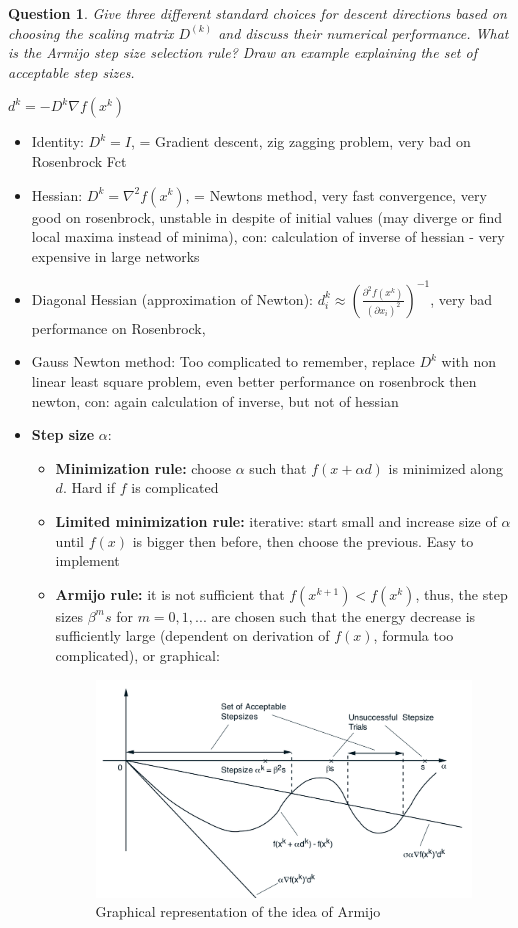 \documentclass{article}
\newtheorem{question}{Question}
\newcommand{\kth}[2][k]{#2^{(#1)}}
\begin{document}
\begin{question}
  Give three different standard choices for descent directions based on choosing the scaling matrix
  \(\kth{D}\) and discuss their numerical performance. What is the Armijo step size selection
  rule? Draw an example explaining the set of acceptable step sizes.
\end{question}
$d^k = -D^k \nabla f (x^k )$
\begin{itemize}
\item Identity: $D^k = I$, = Gradient descent, zig zagging problem, very bad on Rosenbrock Fct
\item Hessian: $D^k = \nabla^2 f(x^k)$, = Newtons method, very fast convergence, very good on
  rosenbrock, unstable in despite of initial values (may diverge or find local maxima instead of
  minima), con: calculation of inverse of hessian - very expensive in large networks
\item Diagonal Hessian (approximation of Newton): $d_i^k \approx \left(
    \frac{\partial^2  f (x^k)}{(\partial x_i)^2}
  \right)^{-1}$, very bad performance on Rosenbrock, 
\item Gauss Newton method: Too complicated to remember, replace $D^k$ with non linear least square
  problem, even better performance on rosenbrock then newton, con: again calculation of inverse, but
  not of hessian
\item \textbf{Step size} $\alpha$: 
  \begin{itemize}
  \item \textbf{Minimization rule:} choose $\alpha$ such that $f(x + \alpha d)$ is minimized along
    $d$. Hard if $f$ is complicated
  \item \textbf{Limited minimization rule:} iterative: start small and increase size of $\alpha$
    until $f(x)$ is bigger then before, then choose the previous. Easy to implement
  \item \textbf{Armijo rule:} it is not sufficient that $f(x^{k+1}) < f(x^k)$, thus, the step sizes
    $\beta^ms$ for $m = 0,1,...$ are chosen such that the energy decrease is sufficiently large
    (dependent on derivation of $f(x)$, formula too complicated), or graphical:
    \begin{figure}[H]
      \includegraphics[width=\textwidth]{armijo.png}
      \caption{Graphical representation of the idea of Armijo\label{fig:desc_dir}}
    \end{figure}
    

\end{itemize}
\end{itemize}
\end{document}
